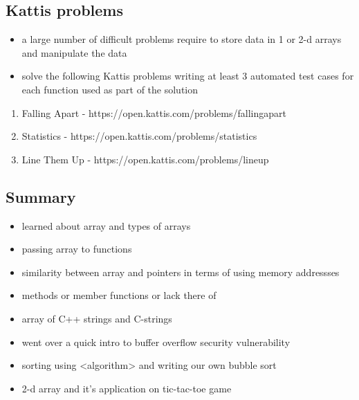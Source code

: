 \documentclass[11pt]{article}
\makeatletter
\providecommand{\tightlist}{%
      \setlength{\itemsep}{0pt}\setlength{\parskip}{0pt}}
\newcommand{\boxspacing}{\kern\kvtcb@left@rule\kern\kvtcb@boxsep}
\newcommand{\prompt}[4]{
        {\ttfamily\llap{{\color{#2}[#3]:\hspace{3pt}#4}}\vspace{-\baselineskip}}
    }
\makeatother
\begin{document}
    \hypertarget{kattis-problems}{%
\subsection{Kattis problems}\label{kattis-problems}}

\begin{itemize}
\tightlist
\item
  a large number of difficult problems require to store data in 1 or 2-d
  arrays and manipulate the data
\item
  solve the following Kattis problems writing at least 3 automated test
  cases for each function used as part of the solution
\end{itemize}

\begin{enumerate}
\def\labelenumi{\arabic{enumi}.}
\item
  Falling Apart - https://open.kattis.com/problems/fallingapart
\item
  Statistics - https://open.kattis.com/problems/statistics
\item
  Line Them Up - https://open.kattis.com/problems/lineup
\end{enumerate}

    \hypertarget{summary}{%
\subsection{Summary}\label{summary}}

\begin{itemize}
\tightlist
\item
  learned about array and types of arrays
\item
  passing array to functions
\item
  similarity between array and pointers in terms of using memory
  addressses
\item
  methods or member functions or lack there of
\item
  array of C++ strings and C-strings
\item
  went over a quick intro to buffer overflow security vulnerability
\item
  sorting using \textless algorithm\textgreater{} and writing our own
  bubble sort
\item
  2-d array and it's application on tic-tac-toe game
\end{itemize}

    \begin{tcolorbox}[breakable, size=fbox, boxrule=1pt, pad at break*=1mm,colback=cellbackground, colframe=cellborder]
\prompt{In}{incolor}{ }{\boxspacing}
\begin{Verbatim}[commandchars=\\\{\}]

\end{Verbatim}
\end{tcolorbox}


    
    
    
\end{document}
